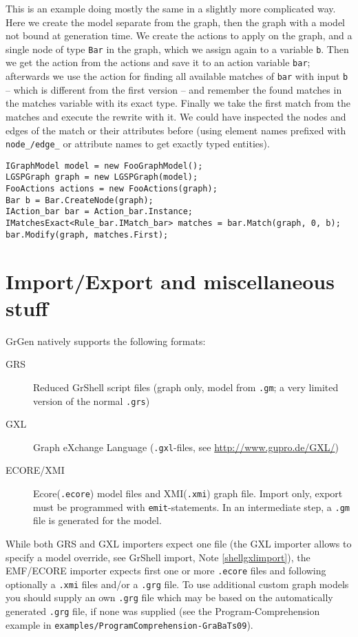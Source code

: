 \begin{example}
This is an example doing mostly the same in a slightly more complicated way.
Here we create the model separate from the graph, then the graph with a model not bound at generation time.
We create the actions to apply on the graph, and a single node of type \texttt{Bar} in the graph, which we assign again to a variable \texttt{b}.
Then we get the action from the actions and save it to an action variable \texttt{bar};
afterwards we use the action for finding all available matches of \texttt{bar} with input \texttt{b} -- which is different from the first version -- and remember the found matches in the matches variable with its exact type.
Finally we take the first match from the matches and execute the rewrite with it.
We could have inspected the nodes and edges of the match or their attributes before (using element names prefixed with \texttt{node\_/edge\_} or attribute names to get exactly typed entities). 
\begin{verbatim}
IGraphModel model = new FooGraphModel();
LGSPGraph graph = new LGSPGraph(model);
FooActions actions = new FooActions(graph);
Bar b = Bar.CreateNode(graph);
IAction_bar bar = Action_bar.Instance;
IMatchesExact<Rule_bar.IMatch_bar> matches = bar.Match(graph, 0, b);
bar.Modify(graph, matches.First);
\end{verbatim}

\end{example}


\section{Import/Export and miscellaneous stuff}\label{sub:imexport}

GrGen natively supports the following formats:
\begin{description}
  \item[GRS] Reduced GrShell script files (graph only, model from \texttt{.gm}; a very limited version of the normal \texttt{.grs})
  \item[GXL] Graph eXchange Language (\texttt{.gxl}-files, see \url{http://www.gupro.de/GXL/})
  \item[ECORE/XMI] Ecore(\texttt{.ecore}) model files and XMI(\texttt{.xmi}) graph file. Import only, export must be programmed with \texttt{emit}-statements. In an intermediate step, a \texttt{.gm} file is generated for the model.
\end{description}

While both GRS and GXL importers expect one file
(the GXL importer allows to specify a model override, see GrShell import, Note \ref{shellgxlimport}),
the EMF/ECORE importer expects first one or more \texttt{.ecore} files and following optionally a \texttt{.xmi} files and/or
a \texttt{.grg} file. To use additional custom graph models you should supply an own \texttt{.grg}
file which may be based on the automatically generated \texttt{.grg} file, if none was
supplied (see the Program-Comprehension example in \texttt{examples/ProgramComprehension-GraBaTs09}).

